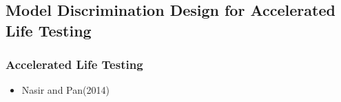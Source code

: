 \documentclass[xcolor=dvipsnames,aspectratio=1610]{beamer}
\begin{document}

\subsection{Model Discrimination Design for Accelerated Life Testing}
\begin{frame}
\frametitle{Accelerated Life Testing}
\begin{itemize}
\item Nasir and Pan(2014)
\end{itemize}
\begin{figure}
\end{figure}
\end{frame}


\end{document}
